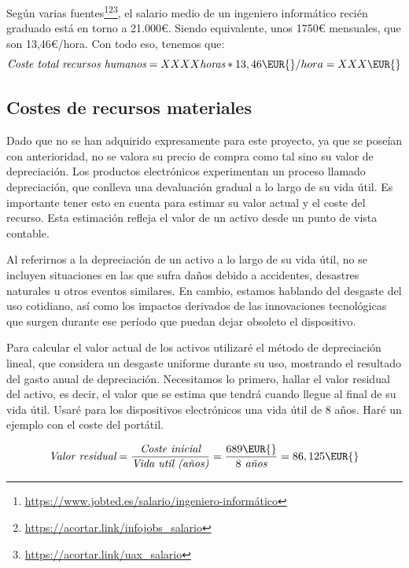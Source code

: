 Según varias fuentes\footnote{\url{https://www.jobted.es/salario/ingeniero-informático}}\footnotecomma\footnote{\url{https://acortar.link/infojobs_salario}}\footnotecomma\footnote{\url{https://acortar.link/uax_salario}}, el salario medio de un ingeniero informático recién graduado está en torno a 21.000€. Siendo equivalente, unos 1750€ mensuales, que son 13,46€/hora. Con todo eso, tenemos que:
\begin{equation*}
    \textit{Coste total recursos humanos} = XXXX \textit{horas} * 13,46\EUR{}/hora = XXX \EUR{}
\end{equation*}


\subsection{Costes de recursos materiales}

Dado que no se han adquirido expresamente para este proyecto, ya que se poseían con anterioridad, no se valora su precio de compra como tal sino su valor de depreciación. Los productos electrónicos experimentan un proceso llamado depreciación, que conlleva una devaluación gradual a lo largo de su vida útil. Es importante tener esto en cuenta para estimar su valor actual y el coste del recurso. Esta estimación refleja el valor de un activo desde un punto de vista contable.

Al referirnos a la depreciación de un activo a lo largo de su vida útil, no se incluyen situaciones en las que sufra daños debido a accidentes, desastres naturales u otros eventos similares. En cambio, estamos hablando del desgaste del uso cotidiano, así como los impactos derivados de las innovaciones tecnológicas que surgen durante ese período que puedan dejar obsoleto el dispositivo.

Para calcular el valor actual de los activos utilizaré el método de depreciación lineal, que considera un desgaste uniforme durante su uso, mostrando el resultado del gasto anual de depreciación\cite{depreciacion_pcs}. Necesitamos lo primero, hallar el valor residual del activo, es decir, el valor que se estima que tendrá cuando llegue al final de su vida útil. Usaré para los dispositivos electrónicos una vida útil de 8 años. Haré un ejemplo con el coste del portátil.

\begin{equation*}
    \textit{Valor residual} = {\frac{\textit{Coste inicial}}{\textit{Vida util (años)}}} = \frac{689 \EUR{}} {8 \textit{ años}} = 86,125 \EUR{}
\end{equation*}

